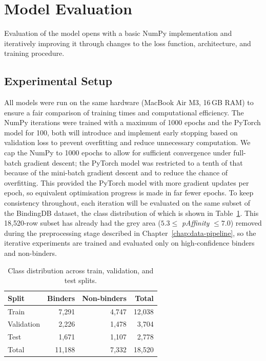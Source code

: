 \section{Model Evaluation}
\label{sec:model_eval}
Evaluation of the model opens with a basic NumPy implementation and iteratively improving it through changes to the loss function, architecture, and training procedure.


    \subsection{Experimental Setup}
    \label{sec: eval_setup}
All models were run on the same hardware (MacBook Air M3, 16\,GB RAM) to ensure a fair comparison of training times and computational efficiency.
The NumPy iterations were trained with a maximum of 1000 epochs and the PyTorch model for 100, both will introduce and implement early stopping based on validation loss to prevent overfitting and reduce unnecessary computation.
We cap the NumPy to 1000 epochs to allow for sufficient convergence under full-batch gradient descent; the PyTorch model was restricted to a tenth of that because of the mini-batch gradient descent and to reduce the chance of overfitting.
This provided the PyTorch model with more gradient updates per epoch, so equivalent optimisation progress is made in far fewer epochs.
To keep consistency throughout, each iteration will be evaluated on the same subset of the BindingDB dataset, the class distribution of which is shown in Table~\ref{tab:class-distribution}.
This 18,520-row subset has already had the grey area ($5.3 \leq$ \textit{pAffinity} $\leq 7.0$) removed during the preprocessing stage described in Chapter~\ref{chap:data-pipeline}, so the iterative experiments are trained and evaluated only on high-confidence binders and non-binders.
\begin{table}[H]
\centering
\caption{Class distribution across train, validation, and test splits.}
\label{tab:class-distribution}
\begin{tabular}{lrrr}
\toprule
\textbf{Split} & \textbf{Binders} & \textbf{Non-binders} & \textbf{Total} \\
\midrule
Train      & 7,291  & 4,747 & 12,038 \\
Validation & 2,226  & 1,478 & 3,704  \\
Test       & 1,671  & 1,107 & 2,778  \\
\midrule
Total      & 11,188 & 7,332 & 18,520 \\
\bottomrule
\end{tabular}
\end{table}

